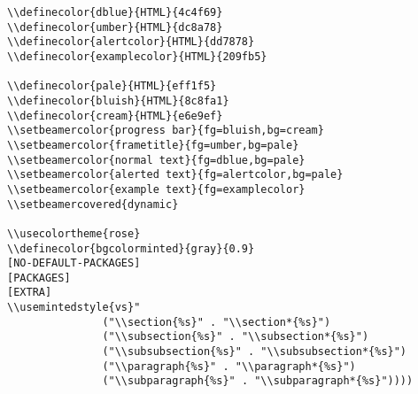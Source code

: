 \documentclass[c]{article}
\theoremstyle{plain}%
\theoremstyle{definition}
\theoremstyle{remark}
\begin{document}
\begin{verbatim}
\\definecolor{dblue}{HTML}{4c4f69}
\\definecolor{umber}{HTML}{dc8a78}
\\definecolor{alertcolor}{HTML}{dd7878}
\\definecolor{examplecolor}{HTML}{209fb5}

\\definecolor{pale}{HTML}{eff1f5}
\\definecolor{bluish}{HTML}{8c8fa1}
\\definecolor{cream}{HTML}{e6e9ef}
\\setbeamercolor{progress bar}{fg=bluish,bg=cream}
\\setbeamercolor{frametitle}{fg=umber,bg=pale}
\\setbeamercolor{normal text}{fg=dblue,bg=pale}
\\setbeamercolor{alerted text}{fg=alertcolor,bg=pale}
\\setbeamercolor{example text}{fg=examplecolor}
\\setbeamercovered{dynamic}

\\usecolortheme{rose}
\\definecolor{bgcolorminted}{gray}{0.9}
[NO-DEFAULT-PACKAGES]
[PACKAGES]
[EXTRA]
\\usemintedstyle{vs}"
               ("\\section{%s}" . "\\section*{%s}")
               ("\\subsection{%s}" . "\\subsection*{%s}")
               ("\\subsubsection{%s}" . "\\subsubsection*{%s}")
               ("\\paragraph{%s}" . "\\paragraph*{%s}")
               ("\\subparagraph{%s}" . "\\subparagraph*{%s}"))))
\end{verbatim}
\end{document}
